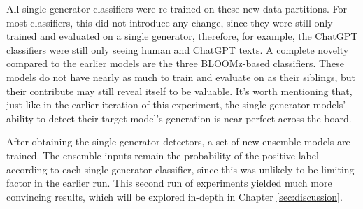 All single-generator classifiers were re-trained on these new data partitions.
For most classifiers, this did not introduce any change, since they were still only trained and evaluated on a single generator, therefore, for example, the ChatGPT classifiers were still only seeing human and ChatGPT texts.
A complete novelty compared to the earlier models are the three BLOOMz-based classifiers.
These models do not have nearly as much to train and evaluate on as their siblings, but their contribute may still reveal itself to be valuable.
It's worth mentioning that, just like in the earlier iteration of this experiment, the single-generator models' ability to detect their target model's generation is near-perfect across the board.

After obtaining the single-generator detectors, a set of new ensemble models are trained.
The ensemble inputs remain the probability of the positive label according to each single-generator classifier, since this was unlikely to be limiting factor in the earlier run.
This second run of experiments yielded much more convincing results, which will be explored in-depth in Chapter \ref{sec:discussion}.